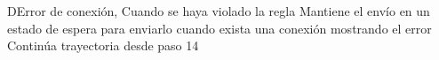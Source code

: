 \begin{UCtrayectoriaA}{D}{Error de conexión,
Cuando se haya violado la regla }
	\UCpaso Mantiene el envío en un estado de espera para enviarlo cuando exista una conexión mostrando el error 
	\UCpaso Continúa trayectoria desde paso 14 
\end{UCtrayectoriaA}

















